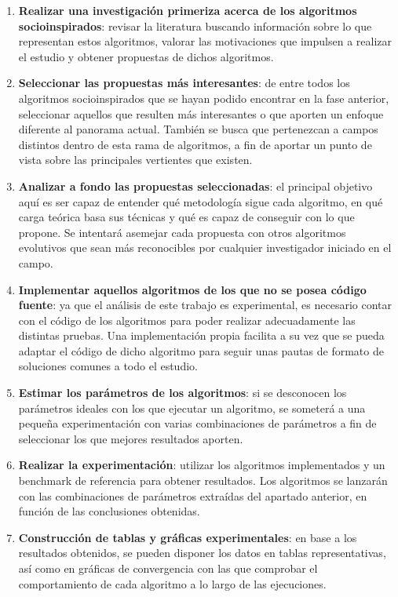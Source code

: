 \begin{enumerate}
	\item{\textbf{Realizar una investigación primeriza acerca de los algoritmos socioinspirados}: revisar la literatura buscando información sobre lo que representan estos algoritmos, valorar las motivaciones que impulsen a realizar el estudio y obtener propuestas de dichos algoritmos.}
	\item{\textbf{Seleccionar las propuestas más interesantes}: de entre todos los algoritmos socioinspirados que se hayan podido encontrar en la fase anterior, seleccionar aquellos que resulten más interesantes o que aporten un enfoque diferente al panorama actual. También se busca que pertenezcan a campos distintos dentro de esta rama de algoritmos, a fin de aportar un punto de vista sobre las principales vertientes que existen.}
	\item{\textbf{Analizar a fondo las propuestas seleccionadas}: el principal objetivo aquí es ser capaz de entender qué metodología sigue cada algoritmo, en qué carga teórica basa sus técnicas y qué es capaz de conseguir con lo que propone. Se intentará asemejar cada propuesta con otros algoritmos evolutivos que sean más reconocibles por cualquier investigador iniciado en el campo.}
	\item{\textbf{Implementar aquellos algoritmos de los que no se posea código fuente}: ya que el análisis de este trabajo es experimental, es necesario contar con el código de los algoritmos para poder realizar adecuadamente las distintas pruebas. Una implementación propia facilita a su vez que se pueda adaptar el código de dicho algoritmo para seguir unas pautas de formato de soluciones comunes a todo el estudio.}
	\item{\textbf{Estimar los parámetros de los algoritmos}: si se desconocen los parámetros ideales con los que ejecutar un algoritmo, se someterá a una pequeña experimentación con varias combinaciones de parámetros a fin de seleccionar los que mejores resultados aporten.}
	\item{\textbf{Realizar la experimentación}: utilizar los algoritmos implementados y un benchmark de referencia para obtener resultados. Los algoritmos se lanzarán con las combinaciones de parámetros extraídas del apartado anterior, en función de las conclusiones obtenidas.}
	\item{\textbf{Construcción de tablas y gráficas experimentales}: en base a los resultados obtenidos, se pueden disponer los datos en tablas representativas, así como en gráficas de convergencia con las que comprobar el comportamiento de cada algoritmo a lo largo de las ejecuciones.}

\end{enumerate}

